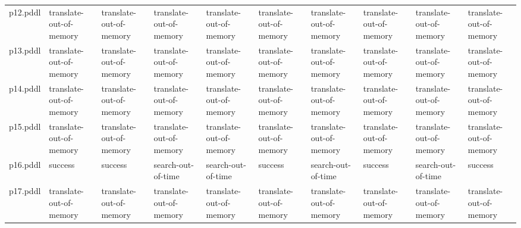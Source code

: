 \documentclass{article}
\begin{document}
\begin{tabular}{@{}lrrrrrrrrr@{}}
p12.pddl & \multicolumn{1}{|l|}{translate-out-of-memory} & \multicolumn{1}{|l|}{translate-out-of-memory} & \multicolumn{1}{|l|}{translate-out-of-memory} & \multicolumn{1}{|l|}{translate-out-of-memory} & \multicolumn{1}{|l|}{translate-out-of-memory} & \multicolumn{1}{|l|}{translate-out-of-memory} & \multicolumn{1}{|l|}{translate-out-of-memory} & \multicolumn{1}{|l|}{translate-out-of-memory} & \multicolumn{1}{|l|}{translate-out-of-memory} \\
p13.pddl & \multicolumn{1}{|l|}{translate-out-of-memory} & \multicolumn{1}{|l|}{translate-out-of-memory} & \multicolumn{1}{|l|}{translate-out-of-memory} & \multicolumn{1}{|l|}{translate-out-of-memory} & \multicolumn{1}{|l|}{translate-out-of-memory} & \multicolumn{1}{|l|}{translate-out-of-memory} & \multicolumn{1}{|l|}{translate-out-of-memory} & \multicolumn{1}{|l|}{translate-out-of-memory} & \multicolumn{1}{|l|}{translate-out-of-memory} \\
p14.pddl & \multicolumn{1}{|l|}{translate-out-of-memory} & \multicolumn{1}{|l|}{translate-out-of-memory} & \multicolumn{1}{|l|}{translate-out-of-memory} & \multicolumn{1}{|l|}{translate-out-of-memory} & \multicolumn{1}{|l|}{translate-out-of-memory} & \multicolumn{1}{|l|}{translate-out-of-memory} & \multicolumn{1}{|l|}{translate-out-of-memory} & \multicolumn{1}{|l|}{translate-out-of-memory} & \multicolumn{1}{|l|}{translate-out-of-memory} \\
p15.pddl & \multicolumn{1}{|l|}{translate-out-of-memory} & \multicolumn{1}{|l|}{translate-out-of-memory} & \multicolumn{1}{|l|}{translate-out-of-memory} & \multicolumn{1}{|l|}{translate-out-of-memory} & \multicolumn{1}{|l|}{translate-out-of-memory} & \multicolumn{1}{|l|}{translate-out-of-memory} & \multicolumn{1}{|l|}{translate-out-of-memory} & \multicolumn{1}{|l|}{translate-out-of-memory} & \multicolumn{1}{|l|}{translate-out-of-memory} \\
p16.pddl & \multicolumn{1}{|l|}{success} & \multicolumn{1}{|l|}{success} & \multicolumn{1}{|l|}{search-out-of-time} & \multicolumn{1}{|l|}{search-out-of-time} & \multicolumn{1}{|l|}{success} & \multicolumn{1}{|l|}{search-out-of-time} & \multicolumn{1}{|l|}{success} & \multicolumn{1}{|l|}{search-out-of-time} & \multicolumn{1}{|l|}{success} \\
p17.pddl & \multicolumn{1}{|l|}{translate-out-of-memory} & \multicolumn{1}{|l|}{translate-out-of-memory} & \multicolumn{1}{|l|}{translate-out-of-memory} & \multicolumn{1}{|l|}{translate-out-of-memory} & \multicolumn{1}{|l|}{translate-out-of-memory} & \multicolumn{1}{|l|}{translate-out-of-memory} & \multicolumn{1}{|l|}{translate-out-of-memory} & \multicolumn{1}{|l|}{translate-out-of-memory} & \multicolumn{1}{|l|}{translate-out-of-memory} \\

\end{tabular}
\end{document}

